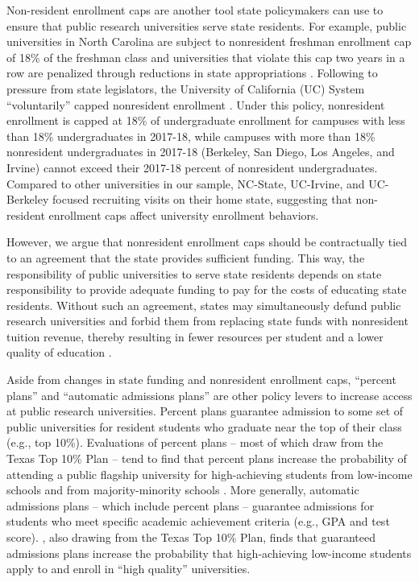 \documentclass[twoside]{article}
\begin{document}
Non-resident enrollment caps are another tool state policymakers can use to ensure that public research universities serve state residents.  For example, public universities in North Carolina are subject to nonresident freshman enrollment cap of 18\% of the freshman class and universities that violate this cap two years in a row are penalized through reductions in state appropriations \citep{RN4424}. Following to pressure from state legislators, the  University of California (UC) System ``voluntarily'' capped nonresident enrollment \citep{RN4433}. Under this policy, nonresident enrollment is capped at 18\% of undergraduate enrollment for campuses with less than 18\% undergraduates in 2017-18, while campuses with more than 18\% nonresident undergraduates in 2017-18 (Berkeley, San Diego, Los Angeles, and Irvine) cannot exceed their 2017-18 percent of nonresident undergraduates.  Compared to other universities in our sample, NC-State, UC-Irvine, and UC-Berkeley focused recruiting visits on their home state, suggesting that non-resident enrollment caps affect university enrollment behaviors.

However, we argue that nonresident enrollment caps should be contractually tied to an agreement that the state provides sufficient funding. This way, the responsibility of public universities to serve state residents depends on state responsibility to provide adequate funding to pay for the costs of educating state residents.  Without such an agreement, states may simultaneously defund public research universities and forbid them from replacing state funds with nonresident tuition revenue, thereby resulting in fewer resources per student and a lower quality of education \citep{RN532}.

Aside from changes in state funding and nonresident enrollment caps, ``percent plans'' and ``automatic admissions plans'' are other policy levers to increase access at public research universities.  Percent plans guarantee admission to some set of public universities for resident students who graduate near the top of their class (e.g., top 10\%).  Evaluations of percent plans -- most of which draw from the Texas Top 10\% Plan -- tend to find that percent plans increase the probability of attending a public flagship university for high-achieving students from low-income schools and from majority-minority schools \citep{RN4434,RN4435,RN4437,RN4436}.  More generally, automatic admissions plans -- which include percent plans -- guarantee admissions for students who meet specific academic achievement criteria (e.g., GPA and test score).  \cite{RN4428}, also drawing from the Texas Top 10\% Plan, finds that guaranteed admissions plans increase the probability that high-achieving low-income students apply to and enroll in ``high quality'' universities.
\end{document}
